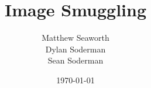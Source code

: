\documentclass{article}
\begin{document}
\title{Image Smuggling}
\author{Matthew Seaworth \\ Dylan Soderman \\ Sean Soderman}
\date{\today}
\maketitle
\end{document}
